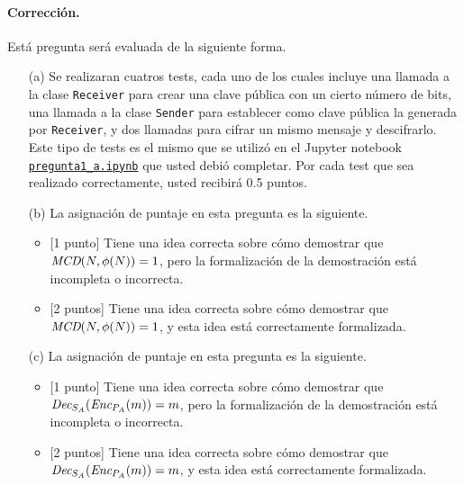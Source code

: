 \paragraph{Corrección.}
Está pregunta será evaluada de la siguiente forma.
\begin{itemize}
  \item[(a)] Se realizaran cuatros tests, cada uno de los cuales
  incluye una llamada a la clase \texttt{Receiver} para crear una
  clave pública con un cierto número de bits, una llamada a la
  clase \texttt{Sender} para establecer como clave pública la generada
  por \texttt{Receiver}, y dos llamadas para cifrar un mismo mensaje
  y descifrarlo. Este tipo de tests es el mismo que se utilizó en el
  Jupyter
  notebook \href{https://github.com/IIC3253/2023/blob/main/tareas/tarea\%202/enunciado/questions/p1/pregunta1_a.ipynb}{\texttt{pregunta1\_a.ipynb}}
  que usted debió completar. Por cada test que sea realizado
  correctamente, usted recibirá 0.5 puntos.

  \item[(b)] La asignación de puntaje en esta pregunta es la siguiente.
\begin{itemize}
    \item{[1 punto]} Tiene una idea correcta sobre cómo demostrar que
    $\textit{MCD}(N, \phi(N)) = 1$, pero la formalización de la demostración
    está incompleta o incorrecta.

    \item{[2 puntos]} Tiene una idea correcta sobre cómo demostrar que
    $\textit{MCD}(N, \phi(N)) = 1$, y esta idea está correctamente
    formalizada.
\end{itemize}

  \item[(c)] La asignación de puntaje en esta pregunta es la siguiente.
\begin{itemize}
    \item{[1 punto]} Tiene una idea correcta sobre cómo demostrar que
    $\textit{Dec}_{S_A}(\textit{Enc}_{P_A}(m)) = m$, pero la formalización de la
    demostración está incompleta o incorrecta.

   \item{[2 puntos]} Tiene una idea correcta sobre cómo demostrar que
   $\textit{Dec}_{S_A}(\textit{Enc}_{P_A}(m)) = m$, y esta idea está correctamente
   formalizada.
\end{itemize}
\end{itemize}

\medskip
